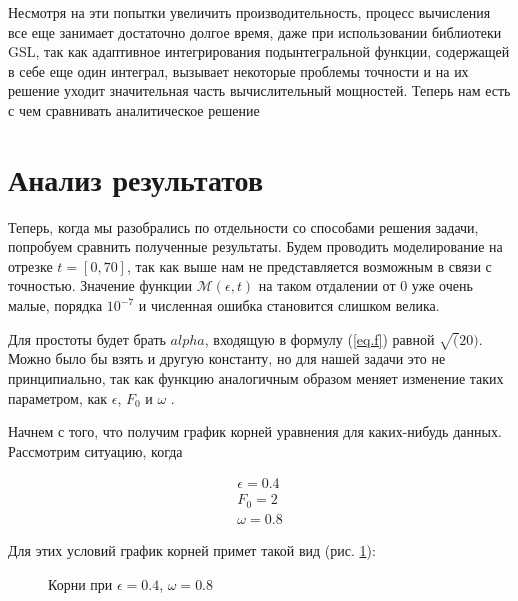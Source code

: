 \documentclass[14pt]{extarticle}
\newcommand{\sectionbreak}{\clearpage}
\newcommand{\cM}{\mathcal{M}}
\begin{document}
Несмотря на эти попытки увеличить производительность, процесс вычисления все еще занимает достаточно долгое время, даже при использовании библиотеки GSL, так как адаптивное интегрирования подынтегральной функции, содержащей в себе еще один интеграл, вызывает некоторые проблемы точности и на их решение уходит значительная часть вычислительный мощностей. 
Теперь нам есть с чем сравнивать аналитическое решение
\sectionbreak


\section{Анализ результатов}
Теперь, когда мы разобрались по отдельности со способами решения задачи, попробуем сравнить полученные результаты.
Будем проводить моделирование на отрезке $t = [0, 70]$, так как выше нам не представляется возможным в связи с точностью. Значение функции $\cM(\epsilon, t)$ на таком отдалении от 0 уже очень малые, порядка $10^{-7}$ и численная ошибка становится слишком велика.

Для простоты будет брать $alpha$, входящую в формулу (\ref{eq.f}) равной $\sqrt(20)$. Можно было бы взять и другую константу, но для нашей задачи это не принципиально, так как функцию аналогичным образом меняет изменение таких параметром, как $\epsilon$, $F_0$ и $\omega$ .

 Начнем с того, что получим график корней уравнения для каких-нибудь данных. Рассмотрим ситуацию, когда 
 
 \begin{eqnarray}
 \epsilon = 0.4 \nonumber \\
F_0 = 2 \nonumber \\
\omega = 0.8 \nonumber
 \end{eqnarray}

Для этих условий график корней примет такой вид (рис. \ref{ris:roots1}):

\begin{figure}[h]
	\caption{Корни при $\epsilon = 0.4$, $\omega = 0.8$}
	\label{ris:roots1}
\end{figure}
\end{document}
